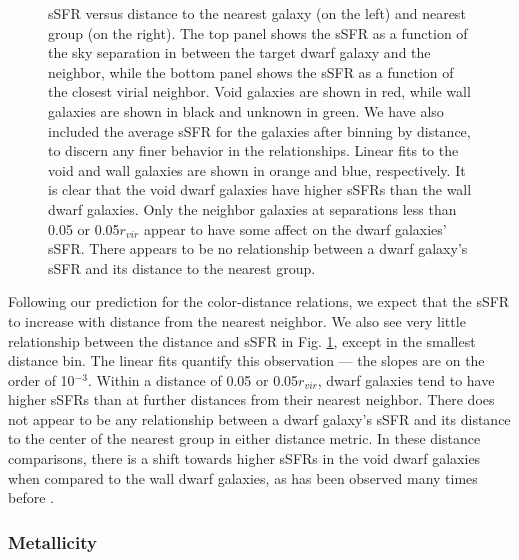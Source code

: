 \begin{figure}
    \caption[sSFR versus distance to nearest neighbor and group]{sSFR versus 
    distance to the nearest galaxy (on the left) and nearest group (on the 
    right).  The top panel shows the sSFR as a function of the sky separation in 
    \hMpc between the target dwarf galaxy and the neighbor, while the bottom 
    panel shows the sSFR as a function of the closest virial neighbor.  Void 
    galaxies are shown in red, while wall galaxies are shown in black and 
    unknown in green.  We have also included the average sSFR for the galaxies 
    after binning by distance, to discern any finer behavior in the 
    relationships.  Linear fits to the void and wall galaxies are shown in 
    orange and blue, respectively.  It is clear that the void dwarf galaxies 
    have higher sSFRs than the wall dwarf galaxies.  Only the neighbor galaxies 
    at separations less than 0.05 \hMpc or 0.05$r_{vir}$ appear to have some 
    affect on the dwarf galaxies' sSFR.  There appears to be no relationship 
    between a dwarf galaxy's sSFR and its distance to the nearest group.}
    \label{fig:sSFR}
\end{figure}

Following our prediction for the color-distance relations, we expect that the 
sSFR to increase with distance from the nearest neighbor.  We also see very 
little relationship between the distance and sSFR in Fig. \ref{fig:sSFR}, except 
in the smallest distance bin.  The linear fits quantify this observation --- the 
slopes are on the order of 10$^{-3}$.  Within a distance of 0.05 \hMpc or 
0.05$r_{vir}$, dwarf galaxies tend to have higher sSFRs than at further 
distances from their nearest neighbor.  There does not appear to be any 
relationship between a dwarf galaxy's sSFR and its distance to the center of the 
nearest group in either distance metric.  In these distance comparisons, there 
is a shift towards higher sSFRs in the void dwarf galaxies when compared to the 
wall dwarf galaxies, as has been observed many times before \citep{Rojas05,
vonBendaBeckmann08,Moorman15,Beygu16}.  


\subsubsection{Metallicity}

